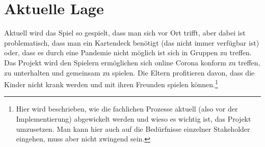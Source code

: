 \section{Aktuelle Lage}

Aktuell wird das Spiel so gespielt, dass man sich vor Ort trifft, aber dabei ist problematisch, dass man ein Kartendeck benötigt (das nicht immer verfügbar ist) oder, dass es durch eine Pandemie nicht möglich ist sich in Gruppen zu treffen. Das Projekt wird den Spielern ermöglichen sich online Corona konform zu treffen, zu unterhalten und gemeinsam zu spielen. Die Eltern profitieren davon, dass die Kinder nicht krank werden und mit ihren Freunden spielen können.\footnote{Hier wird beschrieben, wie die fachlichen Prozesse aktuell (also vor der Implementierung) abgewickelt werden und wieso es wichtig ist, das Projekt umzusetzen. Man kann hier auch auf die Bedürfnisse einzelner Stakeholder eingehen, muss aber nicht zwingend sein.}